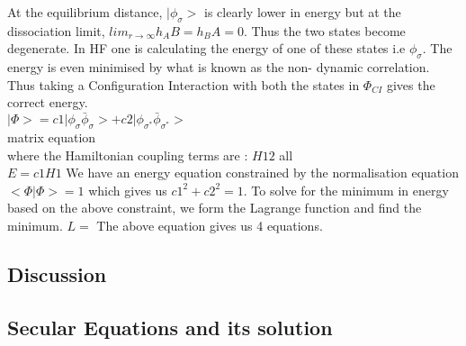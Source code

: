 \documentclass[11pt]{article}   	%
\begin{document}
	At the equilibrium distance, $|\phi_{\sigma}>$ is clearly lower in energy but at the dissociation limit, $lim_{r\rightarrow\infty} h_AB=h_BA=0$. Thus the two states
	become degenerate. In HF one is calculating the energy of one of these states i.e $\phi_{\sigma}$. The energy is even minimised by what is known as the non-
	dynamic correlation. Thus taking a Configuration Interaction with both the states in $\Phi_{CI}$ gives the correct energy.\\
	$|\Phi>=c1 |\phi_{\sigma}\bar{\phi}_{\sigma}>+c2|\phi_{\sigma^*}\bar{\phi}_{\sigma^*}>$\\
	matrix equation\\
	where the Hamiltonian coupling terms are :
	$H12$ all \\
	$E=c1H1$
	We have an energy equation constrained by the normalisation equation $<\Phi|\Phi>=1$ which gives us $c1^2+c2^2=1$.
	To solve for the minimum in energy based on the above constraint, we form the Lagrange function and find the minimum. 
	$L=$
	The above equation gives us 4 equations.
	\subsection{Discussion}
	\subsection{Secular Equations and its solution}
\end{document}
